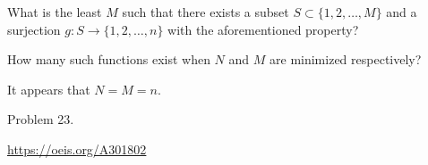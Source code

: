 \documentclass{article}
\begin{document}
\begin{related}
  \item What is the least $M$ such that there exists a subset
  $S \subset \{ 1,2,\hdots,M \}$ and a surjection
  $g\colon S\rightarrow \{ 1,2,\hdots,n \}$ with the aforementioned property?
  \item How many such functions exist when $N$ and $M$ are minimized respectively?
\end{related}
\begin{note}
  It appears that $N = M = n$.
\end{note}
\begin{references}
  \item Problem 23.
  \item \url{https://oeis.org/A301802}
\end{references}
\end{document}
